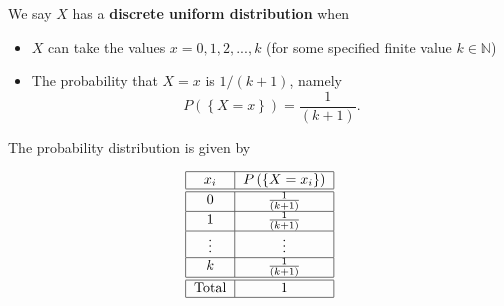 \documentclass[smaller, handout]{beamer}\usepackage[]{graphicx}\usepackage[]{color}
\newenvironment{stepitemize}{\begin{itemize}[<+->]}{\end{itemize} }
\begin{document}
\begin{frame}{\secname}%

\begin{small}
\begin{definition}
We say $X$ has a \textbf{discrete uniform distribution} when

\begin{stepitemize}
\item $X$ can take the values $x=0,1,2,...,k$ (for some specified finite value $k\in \mathbb{N}$)

\item The probability that $X=x$ is $1/\left( k+1\right) $, namely
$$
P\left(\left\{ X=x\right\}\right) = \frac{1}{\left( k+1\right)}.
$$
\end{stepitemize}

The probability distribution is given by
\begin{small}
\begin{equation*}
\begin{tabular}{|c|c|}
\hline
$x_i$ & $P \left(\left\{ X=x_i\right\}\right) $ \\ \hline\hline
$0$ & $\frac{1}{\left( k+1\right) }$ \\ \hline
$1$ & $\frac{1}{\left( k+1\right) }$ \\ \hline
$\vdots $ & $\vdots $ \\ \hline
$k$ & $\frac{1}{\left( k+1\right) }$ \\ \hline\hline
Total & $1$ \\ \hline
\end{tabular}%
\end{equation*}
\end{small}
\end{definition}
\end{small}
\end{frame}
\end{document}
